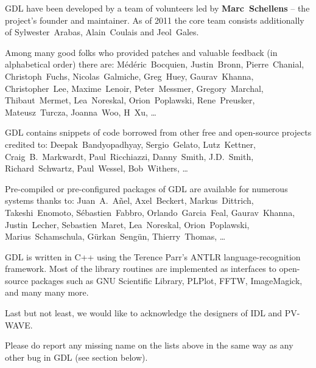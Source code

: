 
GDL have been developed by a team of volunteers led by {\bf Marc~Schellens} --
  the project's founder and maintainer.
As of 2011 the core team consists additionally of 
  Sylwester~Arabas, Alain~Coulais and Jeol~Gales.

Among many good folks who provided patches and valuable feedback (in alphabetical order) there are:
M\'ed\'eric~Bocquien, %
Justin~Bronn, %
Pierre~Chanial, %
Christoph~Fuchs, %
Nicolas~Galmiche, %
Greg~Huey, %
Gaurav~Khanna, %
Christopher~Lee, %
Maxime~Lenoir, %
Peter~Messmer, %
Gregory~Marchal, %
Thibaut~Mermet, %
Lea~Noreskal, %
Orion~Poplawski, %
Rene~Preusker, %
Mateusz~Turcza, %
Joanna~Woo, %
H~Xu, %
\ldots

GDL contains snippets of code borrowed from other free and open-source projects credited to:
Deepak~Bandyopadhyay, %
Sergio~Gelato, %
Lutz~Kettner, %
Craig~B.~Markwardt, %
Paul~Ricchiazzi, %
Danny~Smith, %
J.D.~Smith, %
Richard~Schwartz, %
Paul~Wessel, %
Bob~Withers, %
\ldots

Pre-compiled or pre-configured packages of GDL are available for numerous systems thanks to:
Juan~A.~A\~nel, %
Axel~Beckert, %
Markus~Dittrich, %
Takeshi~Enomoto, %
S\'ebastien~Fabbro, %
Orlando~Garcia~Feal, %
Gaurav~Khanna, %
Justin~Lecher, %
Sebastien~Maret, %
Lea~Noreskal, %
Orion~Poplawski, %
Marius~Schamschula, %
G\"urkan~Seng\"un, %
Thierry~Thomas, %
\ldots

GDL is written in C++ using the Terence Parr's ANTLR language-recognition framework. 
Most of the library routines are implemented as interfaces to open-source packages 
  such as GNU Scientific Library, PLPlot, FFTW, ImageMagick, and many many more. 

Last but not least, we would like to acknowledge the designers of IDL and PV-WAVE.

Please do report any missing name on the lists above in the same way
  as any other bug in GDL (see section below).

